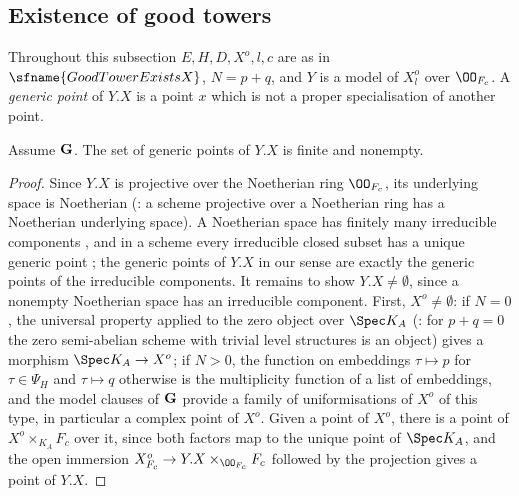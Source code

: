 \subsection{Existence of good towers}\label{pf:towergeo:sec-exist}

Throughout this subsection $E,H,D,X^o,l,c$ are as in $\sfname{GoodTowerExistsX}$, $N=p+q$, and $Y$ is a
model of $X^o_l$ over $\OO_{F_c}$. A \emph{generic point} of $Y.X$ is a point $x$ which is not a proper
specialisation of another point.

\begin{lemma}[Components]\label{pf:towergeo:components}
Assume $\mathbf G$. The set of generic points of $Y.X$ is finite and nonempty.
\end{lemma}

\begin{proof}
Since $Y.X$ is projective over the Noetherian ring $\OO_{F_c}$, its underlying space is Noetherian
(: a scheme projective over a Noetherian
ring has a Noetherian underlying space). A Noetherian space has finitely many irreducible components
\cite[I, Prop.~1.5]{Hartshorne1977}, and in a scheme every irreducible closed subset has a unique generic
point \cite[II, Ex.~2.9]{Hartshorne1977}; the generic points of $Y.X$ in our sense are exactly the generic
points of the irreducible components. It remains to show $Y.X\ne\emptyset$, since a nonempty Noetherian
space has an irreducible component. First, $X^o\ne\emptyset$: if $N=0$, the universal property applied to
the zero object over $\Spec K_A$ (: for $p+q=0$ the zero
semi-abelian scheme with trivial level structures is an object) gives a morphism $\Spec K_A\to X^o$; if
$N>0$, the function on embeddings $\tau\mapsto p$ for $\tau\in\Psi_H$ and $\tau\mapsto q$ otherwise is the
multiplicity function of a list of embeddings, and the model clauses of $\mathbf G$ provide a family of
uniformisations of $X^o$ of this type, in particular a complex point of $X^o$. Given a point of $X^o$, there
is a point of $X^o\times_{K_A}F_c$ over it, since both factors map to the unique point of $\Spec K_A$, and
the open immersion $X^o_{F_c}\to Y.X\times_{\OO_{F_c}}F_c$ followed by the projection gives a point of
$Y.X$.
\end{proof}

